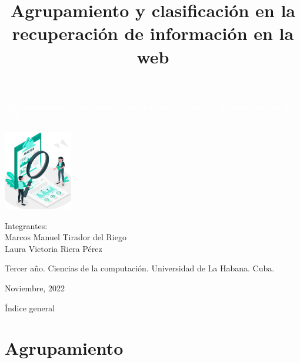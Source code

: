 \documentclass[t,compress,10pt,xcolor=dvipsnames]{beamer}
\title{\textbf{Agrupamiento y clasificaci\'on en la recuperaci\'on de informaci\'on en la web}}
\date{}
\begin{document}
	
	\begin{frame}
		\begin{center}
			\begin{block}{}
				\centering
				\Large\textcolor{white}{\textbf{Agrupamiento y clasificaci\'on en la recuperaci\'on de informaci\'on en la web}}
			\end{block}
		
		\vspace{0.5em}
		\includegraphics[width=3cm]{clustering.jpg}
		
		\vspace{0.5em}
		\footnotesize
		Integrantes:\\
			Marcos Manuel Tirador del Riego\\ 
			Laura Victoria Riera P\'erez
		
		\vspace{0.7em}
		\tiny	
		Tercer año. Ciencias de la computaci\'on. Universidad de La Habana. Cuba.
		
		\vspace{0.7em}
		\scriptsize
		Noviembre, 2022
		\end{center}
	\end{frame}

	\begin{frame}[allowframebreaks]{\'Indice general}
		\tableofcontents[sections={1}]
		\framebreak
		\tableofcontents[sections={2-4}]
	\end{frame}

	\section{Agrupamiento}
\end{document}
